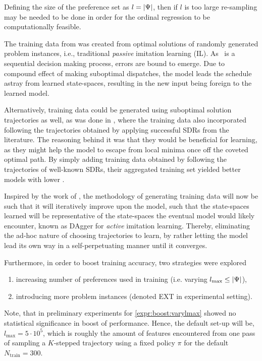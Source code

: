\documentclass[smallextended]{svjour3}
\begin{document}
Defining the size of the preference set as $l=\lvert\Psi\rvert$, then if  $l$ is too 
large re-sampling may be needed to be done in order for the ordinal regression 
to be computationally feasible. 

The training data from \cite{InRu11a} was created from optimal solutions of 
randomly generated problem instances, i.e., traditional \emph{passive} 
imitation learning (IL). 
As \JSP\ is a sequential decision making process, errors are bound to emerge.  
Due to compound effect of making suboptimal dispatches, the model leads the 
schedule astray from learned state-spaces, resulting in the new input being 
foreign to the learned model. 

Alternatively, training data could be generated using suboptimal solution 
trajectories as well, as was done in \cite{InRu15a}, where the training data 
also incorporated following the trajectories obtained by applying successful 
SDRs from the literature. 
The reasoning behind it was that  they would be beneficial for learning, 
as they might help the model to escape from local minima once off the coveted 
optimal path. 
By simply adding training data obtained by following the trajectories of 
well-known SDRs, their aggregated training set yielded better models with lower 
\fullnamerho. 

Inspired by the work of \cite{RossB10,RossGB11}, the methodology of generating 
training data will now be such that it will iteratively improve upon the model, 
such that the state-spaces learned will be representative of the state-spaces 
the eventual model would likely encounter, known as DAgger for \emph{active} 
imitation learning.
Thereby, eliminating the ad-hoc nature of choosing trajectories to learn, by 
rather letting the model lead its own way in a self-perpetuating manner until 
it converges.

Furthermore, in order to boost training accuracy, two strategies were explored 
\begin{enumerate}[after={{}}, leftmargin=*,
  label={\textbf{Boost.\arabic*}}, ref={{Boost.\arabic*}}]
  \item \label{expr:boost:varylmax} increasing number of preferences used 
  in training (i.e. varying \mbox{$l_{\max} \leq \lvert\Psi\rvert$}),
  \item \label{expr:boost:newdata} introducing more problem instances (denoted 
  EXT in experimental setting).
\end{enumerate}
Note, that in preliminary experiments for \ref{expr:boost:varylmax} showed no 
statistical significance in boost of performance. Hence, the default set-up 
will be, $l_{\max}=5 \cdot 10^5$, which is roughly the amount of features 
encountered from one pass of sampling a \mbox{$K$-stepped} trajectory using a 
fixed policy $\pi$ for the default $N_{\text{train}}=300$.
\end{document}
